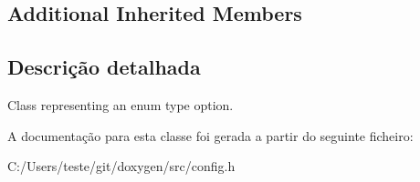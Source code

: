 \subsection*{Additional Inherited Members}


\subsection{Descrição detalhada}
Class representing an enum type option. 

A documentação para esta classe foi gerada a partir do seguinte ficheiro\-:\begin{DoxyCompactItemize}
\item 
C\-:/\-Users/teste/git/doxygen/src/config.\-h\end{DoxyCompactItemize}
